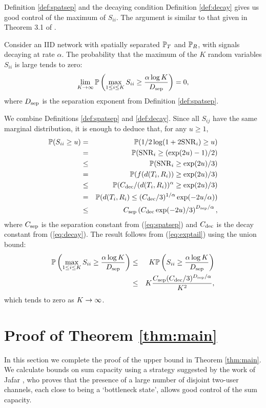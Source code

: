 \documentclass[journal]{IEEEtran}
\begin{document}
Definition \ref{def:spatsep} and the decaying condition Definition \ref{def:decay}
gives us good control of the maximum of $S_{ii}$. The argument is similar
to that given in Theorem 3.1 of \cite{ozgur}.
%
\begin{lemma} \label{lem:tailbd}
Consider an  IID network with spatially separated ${\mathbb {P}}_T$ and 
${\mathbb {P}}_R$, with signals decaying at rate $\alpha$.
The probability that the maximum of the $K$ 
random variables $S_{ii}$ is large tends to zero:
\begin{equation} \label{eq:extreme}
 \lim_{K \rightarrow \infty} {\mathbb {P}} \left( \max_{1 \leq i \leq K} S_{ii} \geq \frac{\alpha \log K}{D_{\rm{sep}}}
\right) = 0, \end{equation}
where $D_{\rm{sep}}$ is the separation exponent from 
Definition \ref{def:spatsep}.
\end{lemma}
\begin{IEEEproof}
 We combine Definitions \ref{def:spatsep} and \ref{def:decay}.
Since all $S_{ij}$ have the same marginal distribution, it is enough to deduce that, for
any $u \geq 1$,
\begin{eqnarray}
{\mathbb {P}}( S_{ii} \geq u) & = & {\mathbb {P}}( 1/2 \log(1 + 2 {\rm{SNR}}_i) \geq u) \nonumber \\
& = & {\mathbb {P}}( {\rm{SNR}}_i \geq (\exp(2u) - 1)/2) \nonumber \\
& \leq & {\mathbb {P}}( {\rm{SNR}}_i \geq \exp(2u)/3) \nonumber \\
& = & {\mathbb {P}}( f(d(T_i, R_i)) \geq \exp(2u)/3) \nonumber \\
& \leq & {\mathbb {P}}( C_{\rm{dec}}/(d(T_i, R_i))^{\alpha} \geq \exp(2u)/3) \nonumber \\
& = & {\mathbb {P}}( d(T_i, R_i) \leq (C_{\rm{dec}}/3)^{1/\alpha} \exp(-2u/\alpha)) \nonumber \\
& \leq & C_{\rm{sep}} \left(C_{\rm{dec}} \exp(-2u)/3 \right)^{D_{\rm{sep}}/\alpha}, \label{eq:exptail}
\end{eqnarray}
where $C_{\rm{sep}}$ is the separation 
constant from (\ref{eq:spatsep}) and $C_{\rm{dec}}$ is the decay 
constant from (\ref{eq:decay}).
The result follows from (\ref{eq:exptail}) using the union bound:
\begin{eqnarray*}
{\mathbb {P}} \left( \max_{1 \leq i \leq K} S_{ii}  \geq  \frac{\alpha \log K}{D_{\rm{sep}}} \right) 
& \leq & K {\mathbb {P}} \left( S_{ii} \geq \frac{\alpha \log K}{D_{\rm{sep}}} \right)  \\
& \leq & K \frac{C_{\rm{sep}} (C_{\rm{dec}}/3)^{D_{\rm{sep}}/\alpha}}{K^2},
\end{eqnarray*}
which tends to zero as $K \rightarrow \infty$. 
\end{IEEEproof}
%
\section{Proof of Theorem \ref{thm:main}} \label{sec:proof}
%
In this section we complete the proof of the upper bound in Theorem
\ref{thm:main}. 
We calculate bounds on sum capacity using a strategy suggested by the work
of Jafar \cite{jafar}, who proves that the presence of a large number of disjoint 
two-user channels, each close to being a `bottleneck state', allows good control 
of the sum capacity. 
\end{document}
